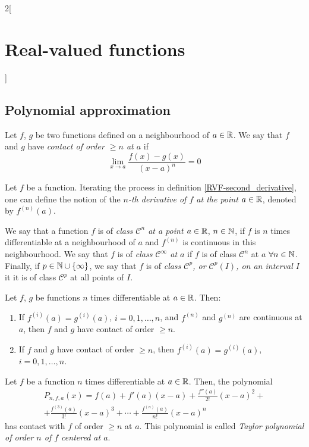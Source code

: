\documentclass[../../../main.tex]{subfiles}
\begin{document}
\begin{multicols}{2}[\section{Real-valued functions}]
  \subsection{Polynomial approximation}
  \begin{definition}
    Let $f$, $g$ be two functions defined on a neighbourhood of $a\in\mathbb{R}$.  We say that $f$ and $g$ have \textit{contact of order $\geq n$ at $a$} if $$\lim_{x\to a}\frac{f(x)-g(x)}{{(x-a)}^n}=0$$
  \end{definition}
  \begin{definition}
    Let $f$ be a function. Iterating the process in definition \ref{RVF-second_derivative}, one can define the notion of the \textit{$n$-th derivative of $f$ at the point $a\in\mathbb{R}$}, denoted by $f^{(n)}(a)$.
  \end{definition}
  \begin{definition}
    We say that a function $f$ is of \textit{class $\mathcal{C}^n$ at a point $a\in\mathbb{R}$}, $n\in\mathbb{N}$, if $f$ is $n$ times differentiable at a neighbourhood of $a$ and $f^{(n)}$ is continuous in this neighbourhood. We say that $f$ is of \textit{class $\mathcal{C}^\infty$ at $a$} if $f$ is of class $\mathcal{C}^n$ at $a$ $\forall n\in\mathbb{N}$. Finally, if $p\in\mathbb{N}\cup\{\infty\}$, we say that $f$ is of \textit{class $\mathcal{C}^p$, or $\mathcal{C}^p(I)$, on an interval $I$} it it is of class $\mathcal{C}^p$ at all points of $I$.
  \end{definition}
  \begin{lemma}
    Let $f$, $g$ be functions $n$ times differentiable at $a\in\mathbb{R}$. Then:
    \begin{enumerate}
      \item If $f^{(i)}(a)=g^{(i)}(a)$, $i=0,1,\ldots,n$, and $f^{(n)}$ and $g^{(n)}$ are continuous at $a$, then $f$ and $g$ have contact of order $\geq n$.
      \item If $f$ and $g$ have contact of order $\geq n$, then $f^{(i)}(a)=g^{(i)}(a)$, $i=0,1,\ldots,n$.
    \end{enumerate}
  \end{lemma}
  \begin{theorem}
    Let $f$ be a function $n$ times differentiable at $a\in\mathbb{R}$. Then, the polynomial
    \begin{multline*}
      P_{n,f,a}(x)=f(a)+f'(a)(x-a)+\frac{f''(a)}{2!}{(x-a)}^2+\\+\frac{f^{(3)}(a)}{3!}{(x-a)}^3+\cdots+\frac{f^{(n)}(a)}{n!}{(x-a)}^n
    \end{multline*}
    has contact with $f$ of order $\geq n$ at $a$. This polynomial is called \textit{Taylor polynomial of order $n$ of $f$ centered at $a$}.

\end{theorem}
\end{multicols}
\end{document}

